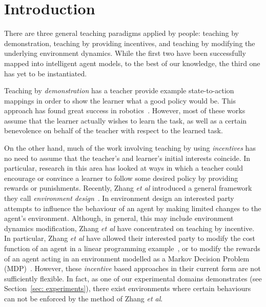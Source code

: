 \section{Introduction}

There are three general teaching paradigms applied by people:
teaching by demonstration, teaching by providing incentives, and
teaching by modifying the underlying environment dynamics.  While the
first two have been successfully mapped into intelligent agent models,
to the best of our knowledge, the third one has yet to be
instantiated.

Teaching by {\em demonstration} has a teacher provide example
state-to-action mappings in order to show the learner what a good
policy would be.  This approach has found great success in
robotics~\cite{argal_etal_2009}. However, most of these works assume
that the learner actually wishes to learn the task, as well as a
certain benevolence on behalf of the teacher with respect to the
learned task.

On the other hand, much of the work involving teaching by using {\em
  incentives} has no need to assume that the teacher's and learner's
initial interests coincide.  In particular, research in this area has
looked at ways in which a teacher could encourage or convince a
learner to follow some desired policy by providing rewards or
punishments.  Recently, Zhang \emph{et al} introduced a general
framework they call \emph{environment
  design}~\cite{Zhang09:General}. In environment design an interested
party attempts to influence the behaviour of an agent by making
limited changes to the agent's environment. Although, in general, this
may include environment dynamics modification, Zhang \emph{et al} have
concentrated on teaching by incentive. In particular, Zhang \emph{et
  al} have allowed their interested party to modify the cost function
of an agent in a linear programming example~\cite{Zhang09:General}, or
to modify the rewards of an agent acting in an environment modelled as
a Markov Decision Problem
(MDP)~\cite{zhang_parkes_2008,Zhang09:Policy}. However, these {\em
  incentive} based approaches in their current form are not
sufficiently flexible. In fact, as one of our experimental domains
demonstrates (see Section~\ref{sec: experiments}), there exist
environments where certain behaviours can not be enforced by the
method of Zhang \emph{et al}.

